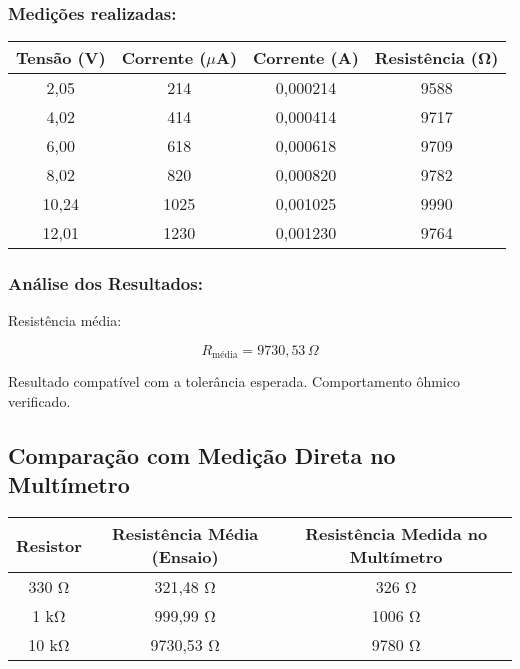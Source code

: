 \subsubsection{Medições realizadas:}

\begin{center}
\begin{tabular}{|c|c|c|c|}
\hline
\textbf{Tensão (V)} & \textbf{Corrente ($\mu$A)} & \textbf{Corrente (A)} & \textbf{Resistência (Ω)} \\
\hline
2,05 & 214 & 0,000214 & 9588 \\
4,02 & 414 & 0,000414 & 9717 \\
6,00 & 618 & 0,000618 & 9709 \\
8,02 & 820 & 0,000820 & 9782 \\
10,24 & 1025 & 0,001025 & 9990 \\
12,01 & 1230 & 0,001230 & 9764 \\
\hline
\end{tabular}
\end{center}

\subsubsection{Análise dos Resultados:}
Resistência média:

\[
R_{\text{média}} = 9730{,}53\,\Omega
\]

Resultado compatível com a tolerância esperada. Comportamento ôhmico verificado.

\vspace{0.5cm}

\subsection{Comparação com Medição Direta no Multímetro}

\begin{center}
\begin{tabular}{|c|c|c|}
\hline
\textbf{Resistor} & \textbf{Resistência Média (Ensaio)} & \textbf{Resistência Medida no Multímetro} \\
\hline
330 Ω & 321,48 Ω & 326 Ω \\
1 kΩ & 999,99 Ω & 1006 Ω \\
10 kΩ & 9730,53 Ω & 9780 Ω \\
\hline
\end{tabular}
\end{center}

\vspace{0.5cm}

